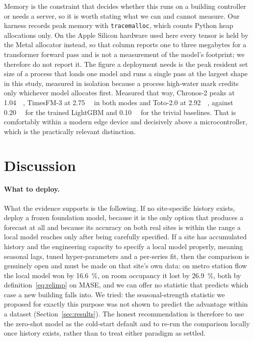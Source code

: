 \documentclass[utf8]{FrontiersinHarvard}
\newif\ifrevisionmarkup
\newcommand{\new}[1]{\ifrevisionmarkup\textcolor{revision}{#1}\else#1\fi}
\newif\ifsecondrevisionmarkup
\newcommand{\rev}[1]{\ifsecondrevisionmarkup\textcolor{revisiontwo}{#1}\else#1\fi}
\theoremstyle{plain}
\theoremstyle{definition}
\theoremstyle{remark}
\begin{document}
Memory is the constraint that decides whether this runs on a building controller or needs a server, so it is worth stating what we can and cannot measure. Our harness records peak memory with \texttt{tracemalloc}, which counts Python heap allocations only. On the Apple Silicon hardware used here every tensor is held by the Metal allocator instead, so that column reports one to three megabytes for a transformer forward pass and is not a measurement of the model's footprint\rev{; we therefore do not report it}. The figure a deployment needs is the peak resident set size of a process that loads one model and runs a single pass at the largest shape in this study, measured in isolation because a process high-water mark credits only whichever model allocates first. Measured that way, Chronos-2 peaks at \SI{1.04}{\gibi\byte}, TimesFM-3 at \SI{2.75}{\gibi\byte} in both modes and Toto-2.0 at \SI{2.92}{\gibi\byte}, against \SI{0.20}{\gibi\byte} for the trained LightGBM and \SI{0.10}{\gibi\byte} for the trivial baselines. That is comfortably within a modern edge device and decisively above a microcontroller, which is the practically relevant distinction.

\section{Discussion}
\label{sec:discussion}
\label{sec:disc}

\paragraph{What to deploy.}
\new{}

\new{What the evidence supports is the following. If no site-specific history exists, deploy a frozen foundation model, because it is the only option that produces a forecast at all and because its accuracy on both real sites is within the range a local model reaches only after being carefully specified. If a site has accumulated history and the engineering capacity to specify a local model properly, meaning seasonal lags, tuned hyper-parameters and a per-series fit, then the comparison is genuinely open and must be made on that site's own data: on metro station flow the local model won by \rev{\SI{16.6}{\percent}}, on room occupancy it lost by \rev{\SI{26.9}{\percent}, both by definition~\eqref{eq:relimp} on MASE}, and we can offer no statistic that predicts which case a new building falls into. We tried: the seasonal-strength statistic we proposed for exactly this purpose \rev{was not shown to} predict the advantage within a dataset (Section~\ref{sec:results}). The honest recommendation is therefore to use the zero-shot model as the cold-start default and to re-run the comparison locally once history exists, rather than to treat either paradigm as settled.}
\end{document}
